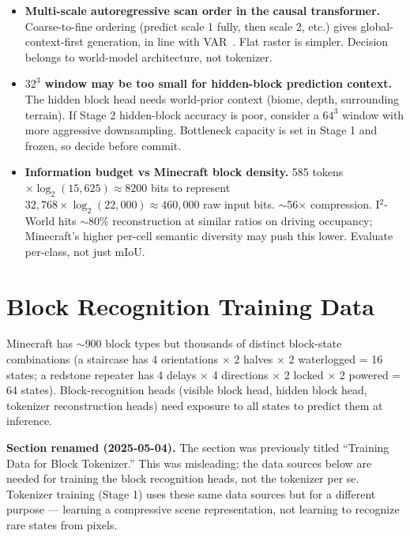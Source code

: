 \documentclass[11pt,a4paper]{article}
\begin{document}
\begin{itemize}
  \item \textbf{Multi-scale autoregressive scan order in the causal transformer.} Coarse-to-fine ordering (predict scale 1 fully, then scale 2, etc.) gives global-context-first generation, in line with VAR~\cite{var}. Flat raster is simpler. Decision belongs to world-model architecture, not tokenizer.
  \item \textbf{$32^3$ window may be too small for hidden-block prediction context.} The hidden block head needs world-prior context (biome, depth, surrounding terrain). If Stage 2 hidden-block accuracy is poor, consider a $64^3$ window with more aggressive downsampling. Bottleneck capacity is set in Stage 1 and frozen, so decide before commit.
  \item \textbf{Information budget vs Minecraft block density.} 585 tokens $\times \log_2(15{,}625) \approx 8200$ bits to represent $32{,}768 \times \log_2(22{,}000) \approx 460{,}000$ raw input bits. $\sim$56$\times$ compression. I$^2$-World hits $\sim$80\% reconstruction at similar ratios on driving occupancy; Minecraft's higher per-cell semantic diversity may push this lower. Evaluate per-class, not just mIoU.
\end{itemize}

\section{Block Recognition Training Data}
\label{sec:blockrecog}

Minecraft has $\sim$900 block types but thousands of distinct block-state combinations (a staircase has 4 orientations $\times$ 2 halves $\times$ 2 waterlogged = 16 states; a redstone repeater has 4 delays $\times$ 4 directions $\times$ 2 locked $\times$ 2 powered = 64 states). Block-recognition heads (visible block head, hidden block head, tokenizer reconstruction heads) need exposure to all states to predict them at inference.

\begin{designdecision}
\textbf{Section renamed (2025-05-04).} The section was previously titled ``Training Data for Block Tokenizer.'' This was misleading: the data sources below are needed for training the block recognition heads, not the tokenizer per se. Tokenizer training (Stage 1) uses these same data sources but for a different purpose --- learning a compressive scene representation, not learning to recognize rare states from pixels.
\end{designdecision}
\end{document}
